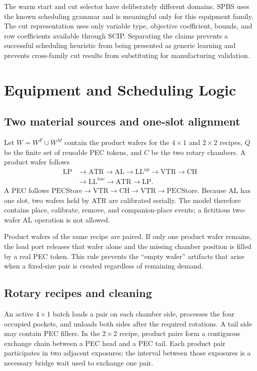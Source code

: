 \documentclass{ifacconf}
\begin{document}
The warm start and cut selector have deliberately different domains. SPBS uses the known scheduling grammar and is meaningful only for this equipment family. The cut representation uses only variable type, objective coefficient, bounds, and row coefficients available through SCIP. Separating the claims prevents a successful scheduling heuristic from being presented as generic learning and prevents cross-family cut results from substituting for manufacturing validation.

\section{Equipment and Scheduling Logic}

\subsection{Two material sources and one-slot alignment}

Let $W=W^{F}\cup W^{M}$ contain the product wafers for the $4\times1$ and $2\times2$ recipes, $Q$ be the finite set of reusable PEC tokens, and $C$ be the two rotary chambers. A product wafer follows
\[
\begin{aligned}
\mathrm{LP}&\rightarrow\mathrm{ATR}\rightarrow\mathrm{AL}\rightarrow\mathrm{LL}^{up}
\rightarrow\mathrm{VTR}\rightarrow\mathrm{CH}\\
&\rightarrow\mathrm{LL}^{low}\rightarrow\mathrm{ATR}\rightarrow\mathrm{LP}.
\end{aligned}
\]
A PEC follows $\mathrm{PECStore}\rightarrow\mathrm{VTR}\rightarrow\mathrm{CH}\rightarrow\mathrm{VTR}\rightarrow\mathrm{PECStore}$. Because AL has one slot, two wafers held by ATR are calibrated serially. The model therefore contains place, calibrate, remove, and companion-place events; a fictitious two-wafer AL operation is not allowed.

Product wafers of the same recipe are paired. If only one product wafer remains, the load port releases that wafer alone and the missing chamber position is filled by a real PEC token. This rule prevents the ``empty wafer'' artifacts that arise when a fixed-size pair is created regardless of remaining demand.

\subsection{Rotary recipes and cleaning}

An active $4\times1$ batch loads a pair on each chamber side, processes the four occupied pockets, and unloads both sides after the required rotations. A tail side may contain PEC fillers. In the $2\times2$ recipe, product pairs form a contiguous exchange chain between a PEC head and a PEC tail. Each product pair participates in two adjacent exposures; the interval between those exposures is a necessary bridge wait used to exchange one pair.
\end{document}

